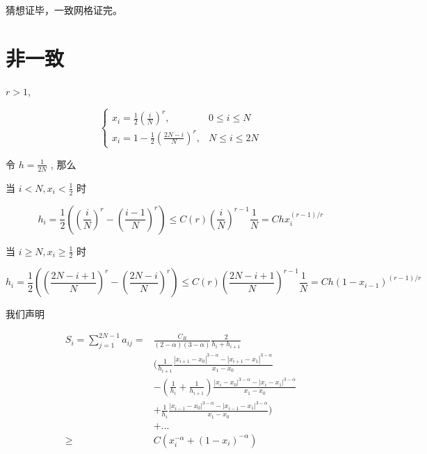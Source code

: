 \documentclass{ctexart}
\begin{document}
猜想证毕，一致网格证完。


\section{非一致}

\(r > 1\),

\begin{equation}
    \begin{cases}
        x_i = \frac{1}{2} \left(\frac{i}{N}\right)^r   ,     & 0 \le i \le N  \\
        x_i = 1 - \frac{1}{2} \left(\frac{2N-i}{N}\right)^r, & N \le i \le 2N
    \end{cases}
\end{equation}

令 \(h=\frac{1}{2N}\) , 那么

当 \(i < N, x_i < \frac{1}{2}\) 时

\begin{equation}
    h_i = \frac{1}{2} \left(\left(\frac{i}{N}\right)^r - \left(\frac{i-1}{N}\right)^r\right)
    \le C(r) \left(\frac{i}{N}\right)^{r-1} \frac{1}{N} = C h x_i^{(r-1)/r}
\end{equation}

当 \(i \ge N, x_i \ge \frac{1}{2}\) 时

\begin{equation}
    h_i = \frac{1}{2} \left(\left(\frac{2N-i+1}{N}\right)^r - \left(\frac{2N-i}{N}\right)^r\right)
    \le C(r) \left(\frac{2N-i+1}{N}\right)^{r-1} \frac{1}{N} = C h (1-x_{i-1})^{(r-1)/r}
\end{equation}


我们声明

\begin{equation}
    \begin{aligned}
        S_i =\sum_{j=1}^{2N-1}a_{ij} = & \frac{C_R}{(2-\alpha)(3-\alpha)} \frac{2}{h_i + h_{i+1}}                                               \\
                                       & ( \frac{1}{h_{i+1}} \frac{|x_{i+1}-x_0|^{3-\alpha} - |x_{i+1}-x_1|^{3-\alpha}}{x_1 - x_0}              \\
                                       & - (\frac{1}{h_{i}}+\frac{1}{h_{i+1}})\frac{|x_{i}-x_0|^{3-\alpha} - |x_{i}-x_1|^{3-\alpha}}{x_1 - x_0} \\
                                       & +  \frac{1}{h_{i}} \frac{|x_{i-1}-x_0|^{3-\alpha} - |x_{i-1}-x_1|^{3-\alpha}}{x_1 - x_0} )             \\
                                       & + ...                                                                                                  \\
        \ge                            & C (x_i^{-\alpha} + (1-x_i)^{-\alpha})
    \end{aligned}
\end{equation}
\end{document}
